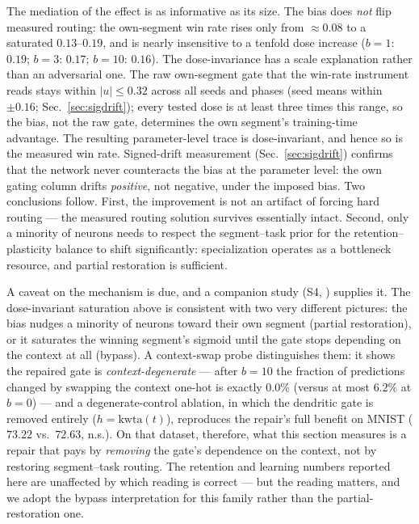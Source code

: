 \documentclass[review,12pt,number]{elsarticle}
\begin{document}
The mediation of the effect is as informative as its size. The bias does
\emph{not} flip measured routing: the own-segment win rate rises only from
$\approx 0.08$ to a saturated $0.13$--$0.19$, and is nearly insensitive
to a tenfold dose increase ($b{=}1$: $0.19$; $b{=}3$: $0.17$; $b{=}10$:
$0.16$). The dose-invariance has a scale explanation rather than an
adversarial one. The raw own-segment gate that the win-rate instrument
reads stays within $|u| \le 0.32$ across all seeds and phases (seed
means within $\pm 0.16$; Sec.~\ref{sec:sigdrift}); every tested dose is
at least three times this range, so the bias, not the raw gate,
determines the own segment's training-time advantage. The resulting
parameter-level trace is dose-invariant, and hence so is the measured
win rate. Signed-drift measurement
(Sec.~\ref{sec:sigdrift}) confirms that the network never counteracts
the bias at the parameter level: the own gating column drifts
\emph{positive}, not negative, under the imposed bias. Two conclusions
follow. First, the improvement is not an artifact of forcing hard
routing --- the measured routing solution survives essentially intact.
Second, only a minority of neurons needs to respect the segment--task
prior for the retention--plasticity balance to shift significantly:
specialization operates as a bottleneck resource, and partial
restoration is sufficient.

A caveat on the mechanism is due, and a companion study
(S4, \cite{zhou2026bypass}) supplies it. The dose-invariant saturation
above is consistent with two very different pictures: the bias nudges a
minority of neurons toward their own segment (partial restoration), or
it saturates the winning segment's sigmoid until the gate stops
depending on the context at all (bypass). A context-swap probe
distinguishes them: it shows the repaired gate is
\emph{context-degenerate} --- after $b{=}10$ the fraction of predictions
changed by swapping the context one-hot is exactly $0.0\%$ (versus at
most $6.2\%$ at $b{=}0$) --- and a degenerate-control ablation, in which
the dendritic gate is removed entirely ($h = \mathrm{kwta}(t)$), reproduces
the repair's full benefit on MNIST ($73.22$ vs.\ $72.63$, n.s.). On that
dataset, therefore, what this section measures is a repair that pays by
\emph{removing} the gate's dependence on the context, not by restoring
segment--task routing. The retention and learning numbers reported here
are unaffected by which reading is correct --- but the reading matters,
and we adopt the bypass interpretation for this family rather than the
partial-restoration one.
\end{document}
